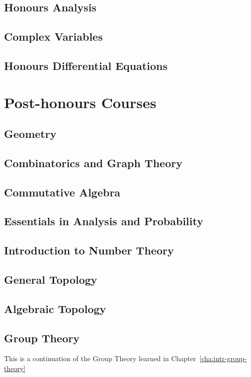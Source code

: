 \documentclass[12pt]{report}
\begin{document}
\chapter{Honours Analysis}\label{cha:honours-analysis}
\chapter{Complex Variables}\label{cha:complex-variables}
\chapter{Honours Differential Equations}\label{cha:hono-diff-equat}

\part{Post-honours Courses}\label{part:post-honours-courses}
\chapter{Geometry}\label{cha:geometry}
\chapter{Combinatorics and Graph Theory}\label{cha:comb-graph-theory}
\chapter{Commutative Algebra}\label{cha:commutative-algebra}
\chapter{Essentials in Analysis and Probability\label{cha:essent-analys-prob}}
\chapter{Introduction to Number Theory}\label{cha:intr-numb-theory}
\chapter{General Topology}\label{cha:general-topology}
\chapter{Algebraic Topology}\label{cha:algebraic-topology}
\chapter{Group Theory}\label{cha:group-theory}
This is a continuation of the Group Theory learned in Chapter~\ref{cha:intr-group-theory}
\end{document}
